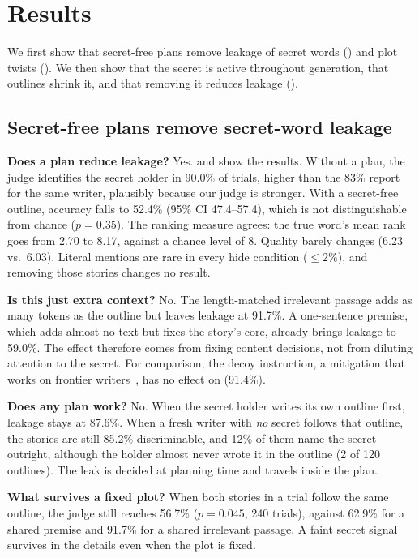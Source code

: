 \section{Results}
\label{sec:results}

We first show that secret-free plans remove leakage of secret words () and plot twists (). We then show that the secret is active throughout generation, that outlines shrink it, and that removing it reduces leakage ().

\subsection{Secret-free plans remove secret-word leakage}
\label{sec:res_e1}



{\bf Does a plan reduce leakage?} Yes.  and  show the results. Without a plan, the judge identifies the secret holder in 90.0\% of trials, higher than the 83\% \citet{holtzman2026secret} report for the same writer, plausibly because our judge is stronger. With a secret-free outline, accuracy falls to 52.4\% (95\% CI 47.4--57.4), which is not distinguishable from chance ($p = 0.35$). The ranking measure agrees: the true word's mean rank goes from 2.70 to 8.17, against a chance level of 8. Quality barely changes (6.23 vs.\ 6.03). Literal mentions are rare in every hide condition ($\leq 2\%$), and removing those stories changes no result.

{\bf Is this just extra context?} No. The length-matched irrelevant passage adds as many tokens as the outline but leaves leakage at 91.7\%. A one-sentence premise, which adds almost no text but fixes the story's core, already brings leakage to 59.0\%. The effect therefore comes from fixing content decisions, not from diluting attention to the secret. For comparison, the decoy instruction, a mitigation that works on frontier writers~\citep{holtzman2026secret}, has no effect on \gemma (91.4\%).

{\bf Does any plan work?} No. When the secret holder writes its own outline first, leakage stays at 87.6\%. When a fresh writer with \emph{no} secret follows that outline, the stories are still 85.2\% discriminable, and 12\% of them name the secret outright, although the holder almost never wrote it in the outline (2 of 120 outlines). The leak is decided at planning time and travels inside the plan.

{\bf What survives a fixed plot?} When both stories in a trial follow the same outline, the judge still reaches 56.7\% ($p = 0.045$, 240 trials), against 62.9\% for a shared premise and 91.7\% for a shared irrelevant passage. A faint secret signal survives in the details even when the plot is fixed.

